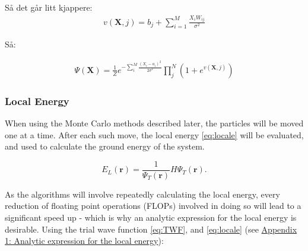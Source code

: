 \documentclass[%
oneside,                 %
final,                   %
10pt]{article}
\begin{document}
Så det går litt kjappere:
\begin{equation}
\begin{aligned}
v(\bm X,j) = b_j + \sum_{i=1}^M \frac{X_i W_{ij} }{\sigma^2}
\end{aligned}
\label{eq:v_j}
\end{equation}

Så:

\begin{equation}
\begin{aligned}
\Psi (\mathbf{X}) = \frac{1}{Z} e^{-\sum_i^M \frac{(X_i - a_i)^2}{2\sigma^2}} \prod_j^N (1 + e^{v(\bm X,j)})
\end{aligned}
\label{eq:TWF}
\end{equation}

\subsubsection{Local Energy}
When using the Monte Carlo methods described later, the particles will be moved one at a time. After each such move, the local energy \eqref{eq:locale} will be evaluated, and used to calculate the ground energy of the system. 
 
\begin{equation}
    E_L(\mathbf{r})=\frac{1}{\Psi_T(\mathbf{r})}H\Psi_T(\mathbf{r}).
    \label{eq:locale}
 \end{equation}
 
As the algorithms will involve repeatedly calculating the local energy, every reduction of floating point operations (FLOPs) involved in doing so will lead to a significant speed up - which is why an analytic expression for the local energy is desirable. Using the trial wave function \eqref{eq:TWF}, and \eqref{eq:locale} (see \hyperref[APP_2:le_1]{Appendix 1: Analytic expression for the local energy}):
\end{document}
